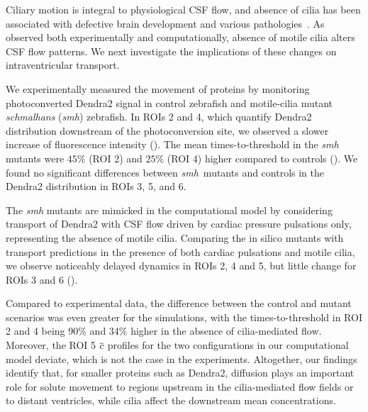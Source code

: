 \documentclass{WileyMSP-template}
\begin{document}
Ciliary motion is integral to physiological CSF flow,
and absence of cilia has been associated with defective
brain development and various pathologies~\cite{Eichele2020Cilia-drivenVentricle,
Olstad2019CiliaryDevelopment, Faubel2016Cilia-basedVentricles,
Guirao2010CouplingCilia, Afzelius2004CiliaRelatedDiseases,
Sawamoto2006NewBrain, Yoshiba2014RolesSymmetry,
Hirokawa2006NodalAsymmetry}.
As observed both experimentally and computationally,
absence of motile cilia alters CSF flow patterns. 
We next investigate the implications of these changes on intraventricular
transport.

We experimentally measured the movement of proteins by monitoring
photoconverted Dendra2 signal in control zebrafish and 
motile-cilia mutant \emph{schmalhans} (\emph{smh}) zebrafish.
In ROIs 2 and 4, which quantify Dendra2 distribution
downstream of the photoconversion site, we observed a slower increase
of fluorescence intensity (). The mean times-to-threshold
in the \emph{smh} mutants were $45\%$ (ROI 2) and $25\%$ (ROI 4) higher
compared to controls (). We found no significant differences
between \emph{smh} mutants and controls
in the Dendra2 distribution in ROIs 3, 5, and 6.

The \emph{smh} mutants are mimicked in the computational model by
considering transport of Dendra2 with CSF flow driven by cardiac
pressure pulsations only, representing the absence of motile
cilia. Comparing the in silico mutants with transport predictions in
the presence of both cardiac pulsations and motile cilia, we observe
noticeably delayed dynamics in ROIs 2, 4 and 5, but little change for
ROIs 3 and 6 ().

Compared to experimental data, the difference between the control and
mutant scenarios was even greater for the simulations, with the
times-to-threshold in ROI 2 and 4 being 90\% and 34\% higher in the
absence of cilia-mediated flow. Moreover, the ROI 5 $\overline{c}$ profiles
for the two configurations in our computational model deviate,
which is not the case in the experiments. Altogether,
our findings identify that, for smaller proteins such as Dendra2,
diffusion plays an important role for
solute movement to regions upstream in the cilia-mediated flow fields or to
distant ventricles, while cilia affect the downstream mean concentrations.
\end{document}
